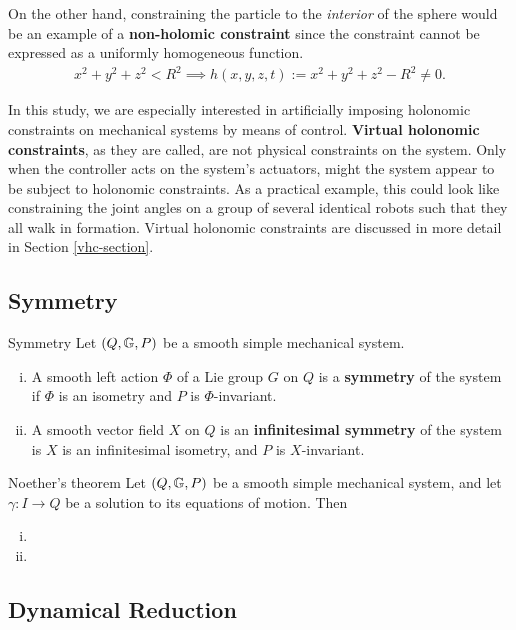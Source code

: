 \documentclass[main.tex]{subfiles}
\begin{document}
On the other hand, constraining the particle to the \textit{interior} of the sphere would be an example of a \textbf{non-holomic constraint} since the constraint cannot be expressed as a uniformly homogeneous function.
\begin{align}
    x^2+y^2+z^2<R^2 \implies h(x,y,z,t):=x^2+y^2+z^2-R^2\neq 0.
\end{align}


In this study, we are especially interested in artificially imposing holonomic constraints on mechanical systems by means of control. \textbf{Virtual holonomic constraints}, as they are called, are not physical constraints on the system. Only when the controller acts on the system's actuators, might the system appear to be subject to holonomic constraints. As a practical example, this could look like constraining the joint angles on a group of several identical robots such that they all walk in formation\cite{maggiore2012virtual}. Virtual holonomic constraints are discussed in more detail in Section \ref{vhc-section}.


\subsection{Symmetry}
\begin{boxdef}{Symmetry\cite[291]{bullo2019geometric}%
}
Let $\del{Q,\mbbg,P}$ be a smooth simple mechanical system. \begin{enumerate}[i.]
    \item A smooth left action $\Phi$ of a Lie group $G$ on $Q$ is a \textbf{symmetry} of the system if $\Phi$ is an isometry and $P$ is $\Phi$-invariant.
    \item A smooth vector field $X$ on $Q$ is an \textbf{infinitesimal symmetry} of the system is $X$ is an infinitesimal isometry, and $P$ is $X$-invariant.
\end{enumerate}
\end{boxdef}

\begin{boxthm}{Noether's theorem\cite[292]{bullo2019geometric}%
}
Let $\del{Q,\mbbg,P}$ be a smooth simple mechanical system, and let $\gamma:I\to Q$ be a solution to its equations of motion. Then
\begin{enumerate}[i.]
    \item 
    \item 
\end{enumerate}
\end{boxthm}


\subsection{Dynamical Reduction}
\end{document}
